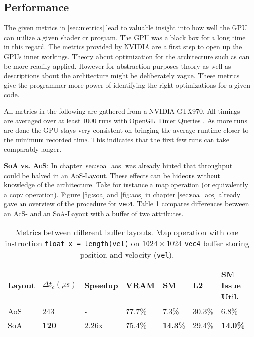 \documentclass[m,times]{cgMA}
\begin{document}
\subsection{Performance}
The given metrics in \ref{sec:metrics} lead to valuable insight into how well the GPU can utilize a given shader or program. The GPU was a black box for a long time in this regard. The metrics provided by NVIDIA are a first step to open up the GPUs inner workings. Theory about optimization for the architecture such as \cite{NVIDIA:BEST:PRACTICE} can be more readily applied. However for abstraction purposes theory as well as descriptions about the architecture might be deliberately vague. These metrics give the programmer more power of identifying the right optimizations for a given code.

All metrics in the following are gathered from a NVIDIA GTX970. All timings are averaged over at least 1000 runs with OpenGL Timer Queries \cite{KHRONOS:TIMER_QUERY}. As more runs are done the GPU stays very consistent on bringing the average runtime closer to the minimum recorded time. This indicates that the first few runs can take comparably longer.

\textbf{SoA vs. AoS}: In chapter \ref{sec:soa_aos} was already hinted that throughput could be halved in an AoS-Layout. These effects can be hideous without knowledge of the architecture. Take for instance a map operation (or equivalently a copy operation). Figure \ref{fig:soa} and \ref{fig:aos} in chapter \ref{sec:soa_aos} already gave an overview of the procedure for \texttt{vec4}. Table \ref{tab:map_1} compares differences between an AoS- and an SoA-Layout with a buffer of two attributes.
\begin{table}[htbp]
  \begin{tabular}{ | l | l | l | l | l | l | l |}    \hline
    Layout &  $\Delta t_c (\mu s)$	& Speedup &VRAM     & SM     & L2     & SM Issue Util. \\\hline
    AoS         & 243                   & -       &77.7\%   & 7.3\%  & 30.3\% & 6.8\% \\\hline
    SoA         & \textbf{120}                   & 2.26x   &75.4\%   & \textbf{14.3}\% & 29.4\% & \textbf{14.0\%} \\
    \hline
  \end{tabular}
\caption{Metrics between different buffer layouts. Map operation with one instruction \texttt{float x = length(vel)} on $1024 \times 1024$ \texttt{vec4} buffer storing position and velocity (\texttt{vel}).}
\label{tab:map_1}
\end{table}
\end{document}

